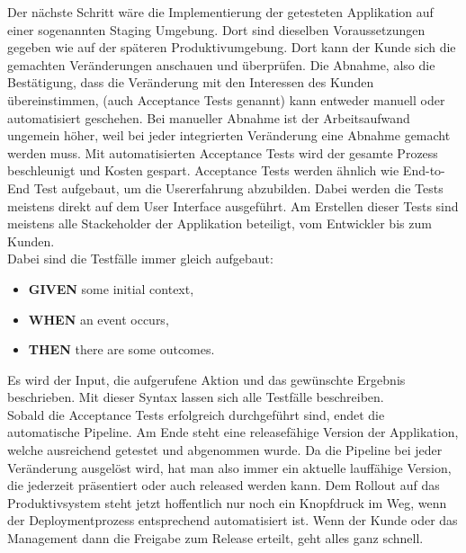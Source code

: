  Der nächste Schritt wäre die Implementierung der getesteten Applikation auf einer sogenannten Staging Umgebung. Dort sind dieselben Voraussetzungen gegeben wie auf der späteren Produktivumgebung.\autocite[Vgl.][S.283]{Farley.2010} Dort kann der Kunde sich die gemachten Veränderungen anschauen und überprüfen. Die Abnahme, also die Bestätigung, dass die Veränderung mit den Interessen des Kunden übereinstimmen, (auch Acceptance Tests genannt) kann entweder manuell oder automatisiert geschehen. Bei manueller Abnahme ist der Arbeitsaufwand ungemein höher, weil bei jeder integrierten Veränderung eine Abnahme gemacht werden muss. Mit automatisierten Acceptance Tests wird der gesamte Prozess beschleunigt und Kosten gespart.\autocite[Vgl.][S.310]{Farley.2010} Acceptance Tests werden ähnlich wie End-to-End Test aufgebaut, um die Usererfahrung abzubilden. Dabei werden die Tests meistens direkt auf dem User Interface ausgeführt. Am Erstellen dieser Tests sind meistens alle Stackeholder der Applikation beteiligt, vom Entwickler bis zum Kunden.\autocite[Vgl.][S.312]{Farley.2010}\\
 Dabei sind die Testfälle immer gleich aufgebaut\autocite[Vgl.][S.312]{Farley.2010}:
 \begin{itemize}
 	\item\textbf{GIVEN} some initial context,
 	\item\textbf{WHEN} an event occurs,
 	\item\textbf{THEN} there are some outcomes.
 \end{itemize}
Es wird der Input, die aufgerufene Aktion und das gewünschte Ergebnis beschrieben. Mit dieser Syntax lassen sich alle Testfälle beschreiben.\autocite[Vgl.][S.312]{Farley.2010}\\
Sobald die Acceptance Tests erfolgreich durchgeführt sind, endet die automatische Pipeline. Am Ende steht eine releasefähige Version der Applikation, welche ausreichend getestet und abgenommen wurde. Da die Pipeline bei jeder Veränderung ausgelöst wird, hat man also immer ein aktuelle lauffähige Version, die jederzeit präsentiert oder auch released werden kann. Dem Rollout auf das Produktivsystem steht jetzt hoffentlich nur noch ein Knopfdruck im Weg, wenn der Deploymentprozess entsprechend automatisiert ist. Wenn der Kunde oder das Management dann die Freigabe zum Release erteilt, geht alles ganz schnell.\autocite[Vgl.][S.289]{Farley.2010}
